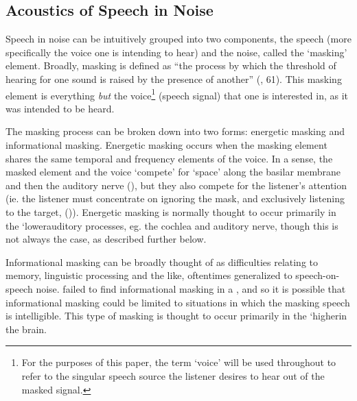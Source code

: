 \subsection{Acoustics of Speech in Noise}
\label{bkgrnd:speech_in_noise}

Speech in noise can be intuitively grouped into two components, the speech (more specifically the voice one is intending to hear) and the noise, called the `masking' element.  Broadly, masking is defined as ``the process by which the threshold of hearing for one sound is raised by the presence of another'' (\cite{ansi:13}, 61).  This masking element is everything \textit{but} the voice\footnote{For the purposes of this paper, the term `voice' will be used throughout to refer to the singular speech source the listener desires to hear out of the masked signal.} (speech signal) that one is interested in, as it was intended to be heard.

The masking process can be broken down into two forms: energetic masking and informational masking.  Energetic masking occurs when the masking element shares the same temporal and frequency elements of the voice.  In a sense, the masked element and the voice `compete' for `space' along the basilar membrane and then the auditory nerve (\cite{brungart:01}), but they also compete for the listener's attention (ie. the listener must concentrate on ignoring the mask, and exclusively listening to the target, (\cite{mattys:12})).  Energetic masking is normally thought to occur primarily in the `lower\DIFaddbegin {}\DIFaddend auditory processes, eg. \DIFaddbegin {}\DIFaddend the cochlea and auditory nerve, though this is not always the case, as described further below.  

Informational masking can be broadly thought of as difficulties relating to memory, linguistic processing \DIFdelbegin \DIFdel{, }\DIFdelend and the like, oftentimes generalized to speech-on-speech noise.  \cite{mattys:10} failed to find informational masking in a \DIFdelbegin {}\DIFdelend \DIFaddbegin {}\DIFaddend , and so it is possible that informational masking could be limited to situations in which the masking speech is intelligible. This type of masking is thought to occur primarily in the `higher\DIFdelbegin {}\DIFdelend \DIFaddbegin {}\DIFaddend in the brain.

